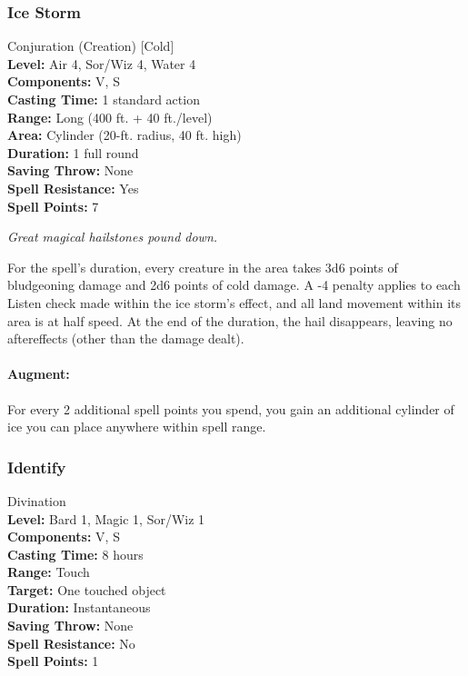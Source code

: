 \subsubsection{Ice Storm}
\label{Spell:IceStorm}
Conjuration (Creation) [Cold]
\\ \textbf{Level:} Air 4, Sor/Wiz 4, Water 4
\\ \textbf{Components:} V, S
\\ \textbf{Casting Time:} 1 standard action
\\ \textbf{Range:} Long (400 ft. + 40 ft./level)
\\ \textbf{Area:} Cylinder (20-ft. radius, 40 ft. high)
\\ \textbf{Duration:} 1 full round
\\ \textbf{Saving Throw:} None
\\ \textbf{Spell Resistance:} Yes
\\ \textbf{Spell Points:} 7

\emph{Great magical hailstones pound down.} 

For the spell's duration, every creature in the area takes 3d6 points of bludgeoning damage and 2d6 points of cold damage. 
A -4 penalty applies to each Listen check made within the ice storm's effect, and all land movement within its area is at half speed. 
At the end of the duration, the hail disappears, leaving no aftereffects (other than the damage dealt).

\paragraph{Augment:} For every 2 additional spell points you spend, you gain an additional cylinder of ice you can place anywhere within spell range.
\subsubsection{Identify}
\label{Spell:Identify}
Divination
\\ \textbf{Level:} Bard 1, Magic 1, Sor/Wiz 1
\\ \textbf{Components:} V, S
\\ \textbf{Casting Time:} 8 hours
\\ \textbf{Range:} Touch
\\ \textbf{Target:} One touched object
\\ \textbf{Duration:} Instantaneous
\\ \textbf{Saving Throw:} None
\\ \textbf{Spell Resistance:} No
\\ \textbf{Spell Points:} 1


